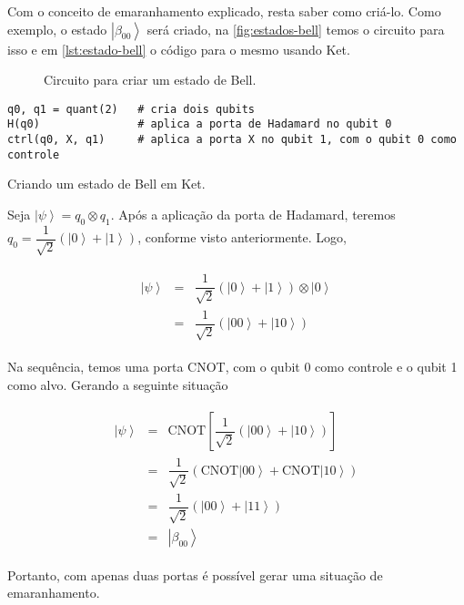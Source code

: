 Com o conceito de emaranhamento explicado, resta saber como criá-lo.
Como exemplo, o estado \(\left| \beta_{00} \right\rangle\) será criado, na \autoref{fig:estados-bell} temos o circuito para isso e em \autoref{lst:estado-bell} o código para o mesmo usando Ket.

\begin{figure}
    \centering
    
    \caption{Circuito para criar um estado de Bell.}
    \label{fig:estados-bell}
\end{figure}

\begin{listing}[!htb]
\begin{verbatim}
q0, q1 = quant(2)   # cria dois qubits
H(q0)               # aplica a porta de Hadamard no qubit 0
ctrl(q0, X, q1)     # aplica a porta X no qubit 1, com o qubit 0 como controle
\end{verbatim}
\caption{Criando um estado de Bell em Ket.}
\label{lst:estado-bell}
\end{listing}

Seja \(\left| \psi \right\rangle = q_0 \otimes q_1\).
Após a aplicação da porta de Hadamard, teremos
\(q_0 = \dfrac{1}{\sqrt{2}} \left( \left| 0 \right\rangle + \left| 1 \right\rangle \right)\),
conforme visto anteriormente.
Logo,

\[\begin{aligned}
\begin{matrix}
    \left| \psi \right\rangle &=&    \dfrac{1}{\sqrt{2}} \left( \left| 0 \right\rangle + \left| 1 \right\rangle \right) \otimes \left| 0 \right\rangle \\
    &=& \dfrac{1}{\sqrt{2}} \left( \left| 00 \right\rangle + \left| 10 \right\rangle\right)
\end{matrix}
\end{aligned}\]

Na sequência, temos uma porta CNOT, com o qubit 0 como controle e o qubit 1 como alvo.
Gerando a seguinte situação

\[\begin{aligned}
\begin{matrix}
    \left| \psi \right\rangle &=&        \text{CNOT} \left[ \dfrac{1}{\sqrt{2}} \left( \left| 00 \right\rangle + \left| 10 \right\rangle\right) \right] \\
    &=& \dfrac{1}{\sqrt{2}} \left( \text{CNOT} \left| 00 \right\rangle + \text{CNOT} \left| 10 \right\rangle \right) \\
    &=& \dfrac{1}{\sqrt{2}} \left( \left| 00 \right\rangle + \left| 11 \right\rangle \right) \\
    &=& \left| \beta_{00} \right\rangle
\end{matrix}
\end{aligned}\]

Portanto, com apenas duas portas é possível gerar uma situação de
emaranhamento.
